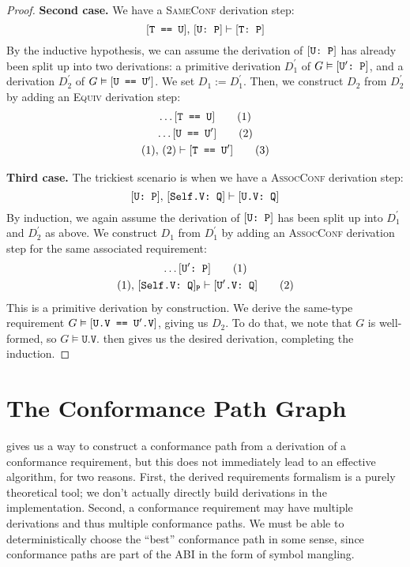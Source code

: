 \documentclass[../generics]{subfiles}
\begin{document}
\begin{proof}
\noindent \textbf{Second case.} We have a \textsc{SameConf} derivation step:
\[[\texttt{T == U}],\,[\texttt{U:~P}]\vdash[\texttt{T:~P}]\]
By the inductive hypothesis, we can assume the derivation of $[\texttt{U:~P}]$ has already been split up into two derivations: a primitive derivation $D_1^\prime$ of $G\vDash[\texttt{$\texttt{U}^\prime$:~P}]$, and a derivation $D_2^\prime$ of $G\vDash[\texttt{U == $\texttt{U}^\prime$}]$. We set $D_1:=D_1^\prime$. Then, we construct $D_2$ from $D_2^\prime$ by adding an \textsc{Equiv} derivation step:
\begin{gather*}
\ldots[\texttt{T == U}]\tag{1}\\
\ldots[\texttt{U == $\texttt{U}^\prime$}]\tag{2}\\
(1),\,(2)\vdash[\texttt{T == $\texttt{U}^\prime$}]\tag{3}
\end{gather*}

\noindent \textbf{Third case.} The trickiest scenario is when we have a \textsc{AssocConf} derivation step:
\[[\texttt{U:~P}],\,[\texttt{Self.V:~Q}]\vdash[\texttt{U.V:~Q}]\]
By induction, we again assume the derivation of $[\texttt{U:~P}]$ has been split up into $D_1^\prime$ and $D_2^\prime$ as above. We construct $D_1$ from $D_1^\prime$ by adding an \textsc{AssocConf} derivation step for the same associated requirement:
\begin{gather*}
\ldots[\texttt{$\texttt{U}^\prime$:~P}]\tag{1}\\
(1),\,[\texttt{Self.V:~Q}]_\texttt{P}\vdash[\texttt{$\texttt{U}^\prime$.V:~Q}]\tag{2}
\end{gather*}
This is a primitive derivation by construction. We derive the same-type requirement $G\vDash[\texttt{U.V == $\texttt{U}^\prime$.V}]$, giving us $D_2$. To do that, we note that $G$ is well-formed, so $G\vDash\texttt{U.V}$.  then gives us the desired derivation, completing the induction.
\end{proof}

\section{The Conformance Path Graph}\label{finding conformance paths}

 gives us a way to construct a conformance path from a derivation of a conformance requirement, but this does not immediately lead to an effective algorithm, for two reasons. First, the derived requirements formalism is a purely theoretical tool; we don't actually directly build derivations in the implementation. Second, a conformance requirement may have multiple derivations and thus multiple conformance paths. We must be able to deterministically choose the ``best'' conformance path in some sense, since conformance paths are part of the ABI in the form of symbol mangling.
\end{document}

